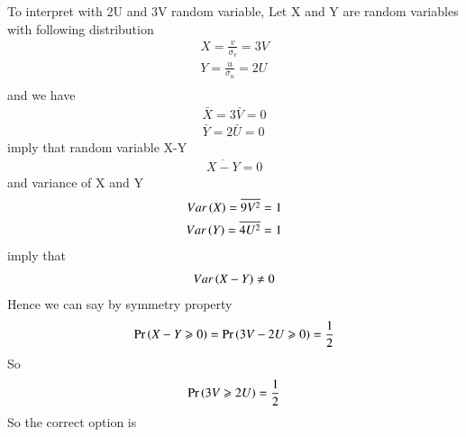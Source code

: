 \documentclass[journal,12pt,twocolumn]{IEEEtran}
\begin{document}
\begin{enumerate}
To interpret with 2U and 3V random variable, Let X and Y are random variables with following distribution 
\begin{align}
X = \frac{v}{\sigma_v}=3V\\
Y = \frac{u}{\sigma_u}=2U\\
\end{align}
and we have
\begin{align}
\bar{X}=3\bar{V}=0\\
\bar{Y}=2\bar{U}=0
\end{align}
imply that random variable X-Y
\begin{align}
\overline{X-Y}=0
\end{align}
and variance of X and Y
\begin{align}
Var\left(X\right)=\overline{9V^2}=1\\
Var\left(Y\right)=\overline{4U^2}=1
\end{align}
imply that
\begin{align}
Var\left(X-Y\right)\neq 0
\end{align}
Hence we can say by symmetry property
\begin{align}
\Pr\left(X-Y\geqslant0\right)=\Pr\left(3V-2U\geqslant0\right)=\frac{1}{2}  
\end{align}
So
\begin{align}
\Pr\left(3V\geqslant2U\right)=\frac{1}{2}
\end{align}
So the correct option is 
\end{enumerate}
\end{document}
